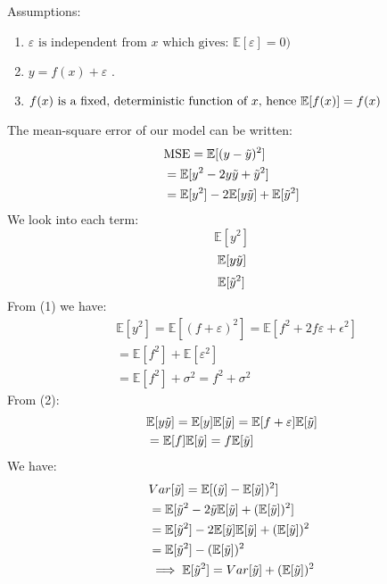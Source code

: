 Assumptions:
\begin{enumerate}
    \item $\varepsilon \text{ is independent from } x \text{ which gives: }\mathbb{E}[\varepsilon]=0)$
    \item $y=f(x) + \varepsilon$ .
    \item $f(x) \text{ is a fixed, deterministic function of } x \text{, hence }\\ \mathbb{E}[f(x)]=f(x)$
\end{enumerate}
{The mean-square error of our model can be written:}
%
%
\begin{align*}
    & \text{MSE} = \mathbb{E}[(y-\Tilde{y})^2]\\
    & = \mathbb{E}[y^2-2y\Tilde{y}+\Tilde{y}^2]\\
    & = \mathbb{E}[y^2]-2\mathbb{E}[y\Tilde{y}]+\mathbb{E}[\Tilde{y}^2]\\
\end{align*}
%
We look into each term:
\begin{equation}
\mathbb{E}[y^2]
\end{equation}
\begin{equation}
    \mathbb{E}[y\Tilde{y}]
\end{equation}
\begin{equation}
    \mathbb{E}[\Tilde{y}^2]
\end{equation}
%
From (1) we have:
 \begin{align*}
     & \mathbb{E}[y^2]=\mathbb{E}[(f+\varepsilon)^2]=\mathbb{E}[f^2+2f\varepsilon+\epsilon^2]\\
     & = \mathbb{E}[f^2]+\mathbb{E}[\varepsilon^2]\\
     & =  \mathbb{E}[f^2]+\sigma^2 = f^2+\sigma^2
 \end{align*}
From (2):
\begin{align*}
    & \mathbb{E}[y\Tilde{y}]=\mathbb{E}[y]\mathbb{E}[\Tilde{y}]
     = \mathbb{E}[f+\varepsilon]\mathbb{E}[\Tilde{y}]\\
    & =\mathbb{E}[f]\mathbb{E}[\Tilde{y}]=f\mathbb{E}[\Tilde{y}]
\end{align*}
We have:
\begin{align*}
    & Var[\Tilde{y}]=\mathbb{E}[(\Tilde{y}]-\mathbb{E}[\Tilde{y}])^2]\\
    & = \mathbb{E}[\Tilde{y}^2-2\Tilde{y}\mathbb{E}[\Tilde{y}]+(\mathbb{E}[\Tilde{y}])^2]\\
    & = \mathbb{E}[\Tilde{y}^2]-2\mathbb{E}[\Tilde{y}]\mathbb{E}[\Tilde{y}]+(\mathbb{E}[\Tilde{y}])^2\\
    & = \mathbb{E}[\Tilde{y}^2]-(\mathbb{E}[\Tilde{y}])^2\\
    & \implies \mathbb{E}[\Tilde{y}^2]= Var[\Tilde{y}]+(\mathbb{E}[\Tilde{y}])^2
\end{align*}
